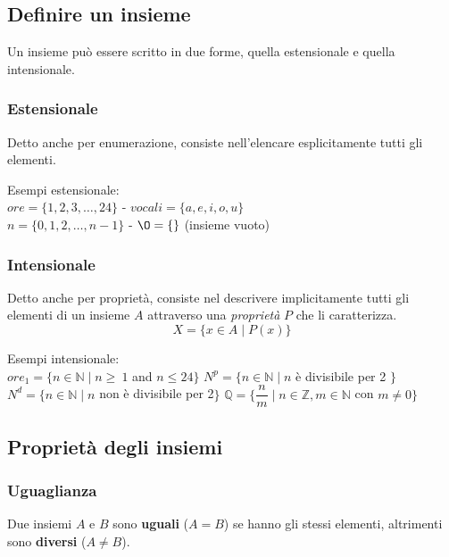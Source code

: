 \subsection{Definire un insieme}
Un insieme può essere scritto in due forme, quella estensionale e quella intensionale.
\subsubsection{Estensionale}
Detto anche per enumerazione, consiste nell'elencare esplicitamente tutti gli elementi.
\begin{example}
	Esempi estensionale:\\
	$ore = \{1, 2, 3, \ldots, 24\}$  -  $vocali = \{a, e, i, o, u\}$ \\
	$n = \{0, 1, 2, \ldots, n-1\}$  -  $\O = \{\}$ (insieme vuoto)
\end{example}

\subsubsection{Intensionale}
Detto anche per proprietà, consiste nel descrivere implicitamente tutti gli elementi di un insieme $A$ attraverso una \emph{proprietà} $P$ che li caratterizza.
\begin{equation}
	X = \{x \in A \mid P(x)\}
\end{equation}
\begin{example}
	Esempi intensionale:\\
	$ore_1 = \{n \in \mathbb{N} \mid n \geq\ 1$ and $n \leq 24\}$
	\hspace{.7cm}
	$N^p = \{n \in \mathbb{N} \mid n$ è divisibile per 2 $\}$
	\\
	$N^d = \{n \in \mathbb{N} \mid n$ non è divisibile per 2$\}$ \hspace{.7cm}
	$\mathbb{Q} = \{\dfrac{n}{m} \mid n \in \mathbb{Z}, m \in \mathbb{N}$ con $ m \neq 0\}$
\end{example}

\newpage
\subsection{Proprietà degli insiemi}
\subsubsection{Uguaglianza}
Due insiemi $A$ e $B$ sono \textbf{uguali} ($A=B$) se hanno gli stessi elementi, altrimenti sono \textbf{diversi} ($A \neq B$).

